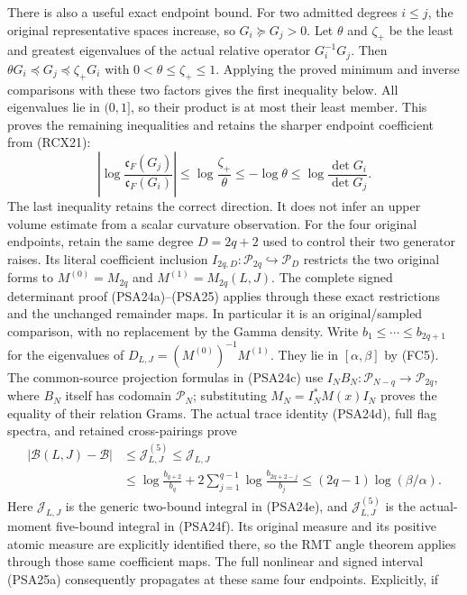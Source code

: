 There is also a useful exact endpoint bound. For two admitted degrees
$i\le j$, the original representative spaces increase, so $G_i\succeq
G_j>0$. Let $\theta$ and $\zeta_+$ be the least and greatest
eigenvalues of the actual relative operator $G_i^{-1}G_j$.
Then $\theta G_i\preceq G_j\preceq\zeta_+G_i$ with
$0<\theta\le\zeta_+\le1$. Applying the proved minimum and inverse
comparisons with these two factors gives the first inequality below.
All eigenvalues lie in $(0,1]$, so their product is at most their
least member. This proves the remaining inequalities and retains
the sharper endpoint coefficient from (RCX21):
\[
 \left|\log\frac{\mathfrak c_F(G_j)}{\mathfrak c_F(G_i)}\right|
 \le\log\frac{\zeta_+}{\theta}
 \le-\log\theta\le\log\frac{\det G_i}{\det G_j}.
 \tag{FC13}
\]
The last inequality retains the correct direction. It does not infer
an upper volume estimate from a scalar curvature observation.
For the four original endpoints, retain the same degree $D=2q+2$
used to control their two generator raises. Its literal coefficient
inclusion $I_{2q,D}:\mathcal P_{2q}\hookrightarrow\mathcal P_D$
restricts the two original forms to
$M^{(0)}=M_{2q}$ and $M^{(1)}=M_{2q}(L,J)$.
The complete signed determinant proof (PSA24a)--(PSA25) applies
through these exact restrictions and the unchanged remainder maps.
In particular it is an original/sampled comparison, with no
replacement by the Gamma density. Write $b_1\le\cdots\le b_{2q+1}$
for the eigenvalues of $D_{L,J}=(M^{(0)})^{-1}M^{(1)}$.
They lie in $[\alpha,\beta]$ by (FC5). The common-source projection
formulas in (PSA24c) use $I_NB_N:\mathcal P_{N-q}\to\mathcal P_{2q}$,
where $B_N$ itself has codomain $\mathcal P_N$; substituting
$M_N=I_N^*M(x)I_N$ proves the equality of their relation Grams.
The actual trace identity (PSA24d), full flag spectra, and retained
cross-pairings prove
\[
 \begin{aligned}
 |\mathcal B(L,J)-\mathcal B|
 &\le\mathcal J^{(5)}_{L,J}\le\mathcal J_{L,J}\\
 &\le\log\frac{b_{q+2}}{b_q}
       +2\sum_{j=1}^{q-1}\log\frac{b_{2q+2-j}}{b_j}
 \le(2q-1)\log(\beta/\alpha).
 \end{aligned}
 \tag{FC13a}
\]
Here $\mathcal J_{L,J}$ is the generic two-bound integral in
(PSA24e), and $\mathcal J^{(5)}_{L,J}$ is the actual-moment
five-bound integral in (PSA24f). Its original measure and its
positive atomic measure are explicitly identified there, so the
RMT angle theorem applies through those same coefficient maps.
The full nonlinear and signed interval (PSA25a) consequently
propagates at these same four endpoints. Explicitly, if
